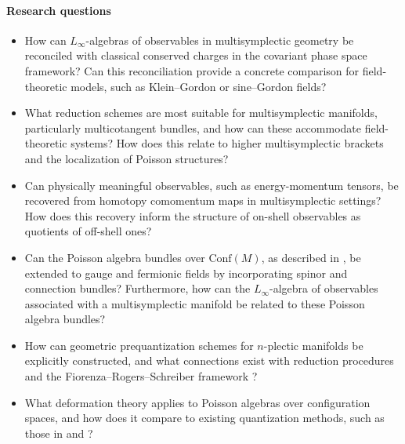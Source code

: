 \documentclass[11pt,a4paper]{article}
\begin{document}
\paragraph{Research questions}

\begin{itemize}[noitemsep,topsep=0pt,parsep=0pt,partopsep=0pt]
    \item How can $L_\infty$-algebras of observables in multisymplectic geometry be reconciled with classical conserved charges in the covariant phase space framework? Can this reconciliation provide a concrete comparison for field-theoretic models, such as Klein–Gordon or sine–Gordon fields?
    \item What reduction schemes are most suitable for multisymplectic manifolds, particularly multicotangent bundles, and how can these accommodate field-theoretic systems? How does this relate to higher multisymplectic brackets and the localization of Poisson structures?
        \item Can physically meaningful observables, such as energy-momentum tensors, be recovered from homotopy comomentum maps in multisymplectic settings? How does this recovery inform the structure of on-shell observables as quotients of off-shell ones?
	\item Can the Poisson algebra bundles over $\mathrm{Conf}(M)$, as described in \cite{Frabetti2024}, be extended to gauge and fermionic fields by incorporating spinor and connection bundles? Furthermore, how can the $L_\infty$-algebra of observables associated with a multisymplectic manifold be related to these Poisson algebra bundles?

    \item How can geometric prequantization schemes for $n$-plectic manifolds be explicitly constructed, and what connections exist with reduction procedures and the Fiorenza–Rogers–Schreiber framework \cite{Fiorenza2014a}?
    \item What deformation theory applies to Poisson algebras over configuration spaces, and how does it compare to existing quantization methods, such as those in \cite{Herscovich-2019} and \cite{Dito:1990}?
\end{itemize}
\end{document}
